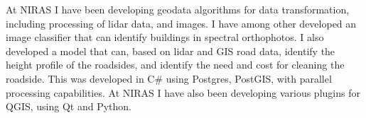       
\divider

At NIRAS I have been developing geodata algorithms for data transformation, including processing of lidar data, and images.
 I have among other developed an image classifier that can identify buildings in spectral orthophotos.
 I also developed a model that can, based on lidar and GIS road data, identify the height profile of the roadsides, and identify the need and cost for cleaning the roadside.
 This was developed in C\# using Postgres, PostGIS, with parallel processing capabilities.
 At NIRAS I have also been developing various plugins for QGIS, using Qt and Python.

     
\divider
